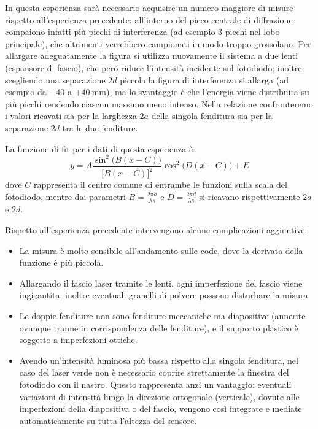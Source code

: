 \documentclass[openany,a4paper,12pt]{book}
\begin{document}
In questa esperienza sarà necessario acquisire un numero maggiore di misure rispetto all'esperienza precedente: all'interno del picco centrale di diffrazione compaiono infatti più picchi di interferenza (ad esempio 3 picchi nel lobo principale), che altrimenti verrebbero campionati in modo troppo grossolano.
Per allargare adeguatamente la figura si utilizza nuovamente il sistema a due lenti (espansore di fascio), che però riduce l'intensità incidente sul fotodiodo; inoltre, scegliendo una separazione $2d$ piccola la figura di interferenza si allarga (ad esempio da $-40$ a $+\SI{40}{\milli\meter}$), ma lo svantaggio è che l'energia viene distribuita su più picchi rendendo ciascun massimo meno intenso. Nella relazione confronteremo i valori ricavati sia per la larghezza $2a$ della singola fenditura sia per la separazione $2d$ tra le due fenditure.

La funzione di fit per i dati di questa esperienza è:
\begin{equation*}
    y = A \frac{\sin^2\bigl(B(x - C)\bigr)}{\bigl[B(x - C)\bigr]^2} \cos^2\bigl(D(x - C)\bigr) + E
\end{equation*}
dove $C$ rappresenta il centro comune di entrambe le funzioni sulla scala del fotodiodo, mentre dai parametri $B = \frac{2\pi a}{\lambda s}$ e $D = \frac{2\pi d}{\lambda s}$ si ricavano rispettivamente $2a$ e $2d$.

Rispetto all'esperienza precedente intervengono alcune complicazioni aggiuntive:
\begin{itemize}
    \item La misura è molto sensibile all'andamento sulle code, dove la derivata della funzione è più piccola.
    \item Allargando il fascio laser tramite le lenti, ogni imperfezione del fascio viene ingigantita; inoltre eventuali granelli di polvere possono disturbare la misura.
    \item Le doppie fenditure non sono fenditure meccaniche ma diapositive (annerite ovunque tranne in corrispondenza delle fenditure), e il supporto plastico è soggetto a imperfezioni ottiche.
    \item Avendo un'intensità luminosa più bassa rispetto alla singola fenditura, nel caso del laser verde non è necessario coprire strettamente la finestra del fotodiodo con il nastro. Questo rappresenta anzi un vantaggio: eventuali variazioni di intensità lungo la direzione ortogonale (verticale), dovute alle imperfezioni della diapositiva o del fascio, vengono così integrate e mediate automaticamente su tutta l'altezza del sensore.
\end{itemize}
\end{document}
